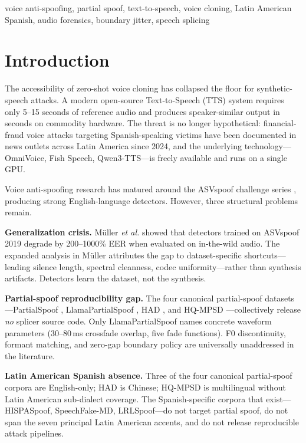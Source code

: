 \documentclass[conference]{IEEEtran}
\begin{document}
\begin{IEEEkeywords}
voice anti-spoofing, partial spoof, text-to-speech, voice cloning, Latin American Spanish, audio forensics, boundary jitter, speech splicing
\end{IEEEkeywords}

\section{Introduction}

The accessibility of zero-shot voice cloning has collapsed the floor for synthetic-speech attacks. A modern open-source Text-to-Speech (TTS) system requires only 5--15 seconds of reference audio and produces speaker-similar output in seconds on commodity hardware. The threat is no longer hypothetical: financial-fraud voice attacks targeting Spanish-speaking victims have been documented in news outlets across Latin America since 2024, and the underlying technology---OmniVoice, Fish Speech, Qwen3-TTS---is freely available and runs on a single GPU.

Voice anti-spoofing research has matured around the ASVspoof challenge series \cite{asvspoof2019,asvspoof2021}, producing strong English-language detectors. However, three structural problems remain.

\textbf{Generalization crisis.} M\"uller \emph{et al.} \cite{muller2022generalize} showed that detectors trained on ASVspoof 2019 degrade by 200--1000\% EER when evaluated on in-the-wild audio. The expanded analysis in M\"uller \cite{muller2024harder} attributes the gap to dataset-specific shortcuts---leading silence length, spectral cleanness, codec uniformity---rather than synthesis artifacts. Detectors learn the dataset, not the synthesis.

\textbf{Partial-spoof reproducibility gap.} The four canonical partial-spoof datasets---PartialSpoof \cite{zhang2023partialspoof}, LlamaPartialSpoof \cite{luong2024llama}, HAD \cite{yi2021had}, and HQ-MPSD \cite{li2025hqmpsd}---collectively release \emph{no} splicer source code. Only LlamaPartialSpoof names concrete waveform parameters (30--80\,ms crossfade overlap, five fade functions). F0 discontinuity, formant matching, and zero-gap boundary policy are universally unaddressed in the literature.

\textbf{Latin American Spanish absence.} Three of the four canonical partial-spoof corpora are English-only; HAD is Chinese; HQ-MPSD is multilingual without Latin American sub-dialect coverage. The Spanish-specific corpora that exist---HISPASpoof, SpeechFake-MD, LRLSpoof---do not target partial spoof, do not span the seven principal Latin American accents, and do not release reproducible attack pipelines.
\end{document}
